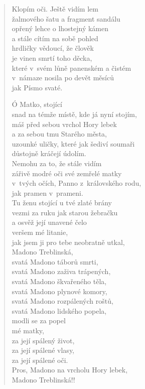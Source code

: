 \begin{verse}
\medskip

Klopím oči. Ještě vidím lem \\
žalmového šatu a fragment sandálu \\
opřený lehce o lhostejný kámen \\
a stále cítím na sobě pohled  \\
hrdličky vědoucí, že člověk \\
je vinen smrtí toho děcka, \\
které v svém lůně panenském a čistém \\
v námaze nosila po devět měsíců \\
jak Písmo svaté.

\medskip

Ó Matko, stojící \\
snad na témže místě, kde já nyní stojím, \\
máš před sebou vrchol Hory lebek \\
a za sebou tmu Starého města, \\
uzounké uličky, které jak šediví soumaři \\
důstojně kráčejí údolím. \\
Nemohu za to, že stále vidím  \\
zářivě modré oči své zemřelé matky \\
v tvých očích, Panno z královského rodu, \\
jak pramen v prameni. \\
Tu ženu stojící u tvé zlaté brány \\
vezmi za ruku jak starou žebračku \\
a osvěž její unavené čelo \\
veršem mé litanie, \\
jak jsem ji pro tebe neobratně utkal, \\
Madono Treblinská, \\
svatá Madono táborů smrti, \\
svatá Madono zaživa trápených, \\
svatá Madono škvařeného těla, \\
svatá Madono plynové komory, \\
svatá Madono rozpálených roštů, \\
svatá Madono lidského popela, \\
modli se za popel \\
mé matky, \\
za její spálený život, \\
za její spálené vlasy, \\
za její spálené oči. \\
Pros, Madono na vrcholu Hory lebek, \\
Madono Treblinská!!


\end{verse}
